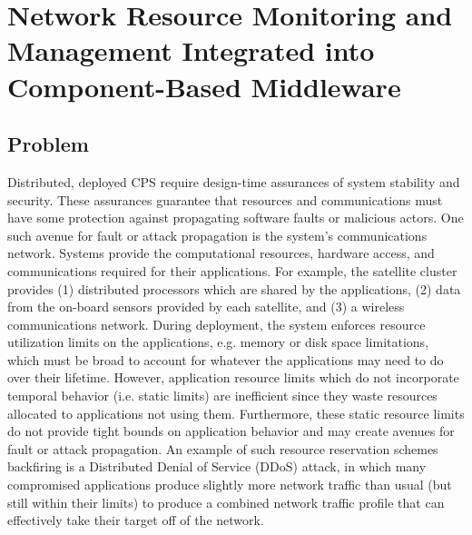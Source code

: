 \iffalse

\section{Network Resource Monitoring and Management Integrated into Component-Based Middleware}
\label{sec:drems}

\subsection{Problem}
Distributed, deployed CPS require design-time assurances of system
stability and security.  These assurances guarantee that resources and
communications must have some protection against propagating software
faults or malicious actors.  One such avenue for fault or attack
propagation is the system's communications network.  Systems provide
the computational resources, hardware access, and communications
required for their applications.  For example, the satellite cluster
provides (1) distributed processors which are shared by the
applications, (2) data from the on-board sensors provided by each
satellite, and (3) a wireless communications network.  During
deployment, the system enforces resource utilization limits on the
applications, e.g. memory or disk space limitations, which must be
broad to account for whatever the applications may need to do over
their lifetime.  However, application resource limits which do not
incorporate temporal behavior (i.e. static limits) are inefficient
since they waste resources allocated to applications not using them.
Furthermore, these static resource limits do not provide tight bounds
on application behavior and may create avenues for fault or attack
propagation.  An example of such resource reservation schemes
backfiring is a Distributed Denial of Service (DDoS) attack, in which
many compromised applications produce slightly more network traffic
than usual (but still within their limits) to produce a combined
network traffic profile that can effectively take their target off of
the network.

